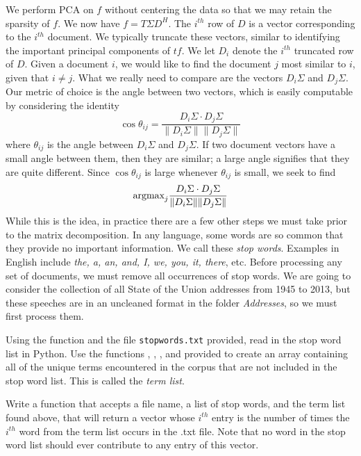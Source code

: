 We perform PCA on $f$ without centering the data so that we may retain the sparsity of $f$. We now have $f = T\Sigma D^{H}$. The $i^{th}$ row of $D$ is a vector corresponding to the $i^{th}$ document. We typically truncate these vectors, similar to identifying the important principal components of $t\!f$. We let $D_{i}$ denote the $i^{th}$ truncated row of $D$. Given a document $i$, we would like to find the document $j$ most similar to $i$, given that $i\neq j$. What we really need to compare are the vectors $D_{i}\Sigma$ and $D_{j}\Sigma$. Our metric of choice is the angle between two vectors, which is easily computable by considering the identity
\begin{equation*}
\cos \theta_{ij} = \frac{D_{i}\Sigma \cdot D_{j}\Sigma}{\|D_{i}\Sigma\| \|D_{j}\Sigma\|}
\end{equation*}
where $\theta_{ij}$ is the angle between $D_{i}\Sigma$ and $D_{j}\Sigma$. If two document vectors have a small angle between them, then they are similar; a large angle signifies that they are quite different. Since $\cos \theta_{ij}$ is large whenever $\theta_{ij}$ is small, we seek to find
\begin{equation*}
\mbox{argmax}_{j} \frac{D_{i}\Sigma \cdot D_{j}\Sigma}{\|D_{i}\Sigma\| \|D_{j}\Sigma\|}
\end{equation*}
While this is the idea, in practice there are a few other steps we must take prior to the matrix decomposition. In any language, some words are so common that they provide no important information. We call these \emph{stop words}. Examples in English include \emph{the, a, an, and, I, we, you, it, there}, etc. Before processing any set of documents, we must remove all occurrences of stop words. We are going to consider the collection of all State of the Union addresses from 1945 to 2013, but these speeches are in an uncleaned format in the folder \emph{Addresses}, so we must first process them.

\begin{problem}
Using the function  and the file
\texttt{stopwords.txt} provided, read in the stop word list in Python.
Use the functions , , ,
and  provided to create an array containing all of the unique
terms encountered in the corpus that are not included in the stop word list.
This is called the \emph{term list}.
\end{problem}

\begin{problem}
Write a function that accepts a file name, a list of stop words, and the term list
found above, that will return a vector whose $i^{th}$ entry is the number of
times the $i^{th}$ word from the term list occurs in the .txt file.
Note that no word in the stop word list should ever contribute to any entry of this vector.
\end{problem}


